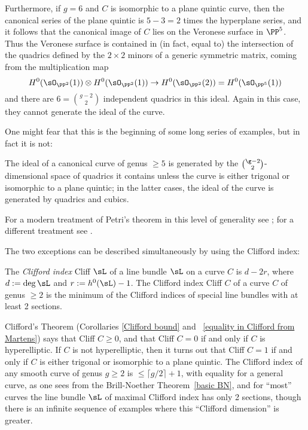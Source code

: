 Furthermore, if $g = 6$ and $C$ is isomorphic to a plane quintic curve, then the canonical series of the plane quintic is $5-3 = 2$ times the hyperplane series, and it follows that the canonical image of $C$ lies on the Veronese surface in $\PP^{5}$. Thus the Veronese surface is contained in (in fact, equal to) the intersection of the quadrics defined by the $2\times 2$ minors of a generic symmetric matrix, coming from the 
multiplication map 
$$
H^{0}(\sO_{\PP^{2}}(1))\otimes H^{0}(\sO_{\PP^{2}}(1)) \to H^{0}(\sO_{\PP^{2}}(2)) = H^{0}(\sO_{\PP^{5}}(1))
$$
and there are $6 = {g-2\choose 2}$ independent quadrics in this ideal. Again in this case, they cannot generate the ideal of the curve.

One might fear that this is the beginning of some long series of examples, but in fact it is not: 

\begin{theorem} [Petri]
The ideal of a canonical curve of genus $\geq 5$ is generated by the $\g-2\choose 2$-dimensional space of quadrics it contains unless the curve is either trigonal or isomorphic to a plane quintic; in the latter cases, the ideal of the curve is generated by quadrics and cubics.
\end{theorem}

For a modern treatment of Petri's theorem in this level of generality see \cite{Schreyer}; for a different treatment see \cite{Arbarello-Sernesi}.

The two exceptions can be described simultaneously by using the Clifford index:

\begin{definition}
 The \emph{Clifford index} Cliff $\sL$ of a line bundle $\sL$ on a curve $C$ is $d-2r$, where $d := \deg \sL$ and $r :=  h^0(\sL)-1$. The Clifford index Cliff $C$ of
 a curve $C$ of genus $\geq 2$ is the minimum of the Clifford indices of special line bundles with at least 2 sections.
\end{definition}

Clifford's Theorem (Corollaries \ref{Clifford bound} and ~\ref{equality in Clifford from Martens}) says that Cliff $C \geq 0$, and that Cliff $C = 0$ if and only if $C$ is hyperelliptic. If $C$ is not hyperelliptic, then it turns out that Cliff $C=1$ if and only if $C$ is either trigonal or isomorphic to a plane quintic. The Clifford index of any smooth curve of genus $g\geq 2$ is $\leq \lceil g/2\rceil+1$, with equality for a general curve, as one sees from the Brill-Noether Theorem~\ref{basic BN}, and for ``most'' curves the line bundle $\sL$ of maximal Clifford index has only 2 sections, though there is an infinite sequence of examples where this
``Clifford dimension'' is greater.

